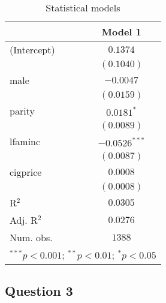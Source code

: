 \documentclass[
]{article}
\begin{document}
\begin{table}
\caption{Statistical models}
\begin{center}
\begin{tabular}{l c}
\hline
 & Model 1 \\
\hline
(Intercept) & $0.1374$        \\
            & $(0.1040)$      \\
male        & $-0.0047$       \\
            & $(0.0159)$      \\
parity      & $0.0181^{*}$    \\
            & $(0.0089)$      \\
lfaminc     & $-0.0526^{***}$ \\
            & $(0.0087)$      \\
cigprice    & $0.0008$        \\
            & $(0.0008)$      \\
\hline
R$^2$       & $0.0305$        \\
Adj. R$^2$  & $0.0276$        \\
Num. obs.   & $1388$          \\
\hline
\multicolumn{2}{l}{\scriptsize{$^{***}p<0.001$; $^{**}p<0.01$; $^{*}p<0.05$}}
\end{tabular}
\label{table:coefficients}
\end{center}
\end{table}

\newpage

\hypertarget{question-3}{%
\subsection{Question 3}\label{question-3}}
\end{document}
